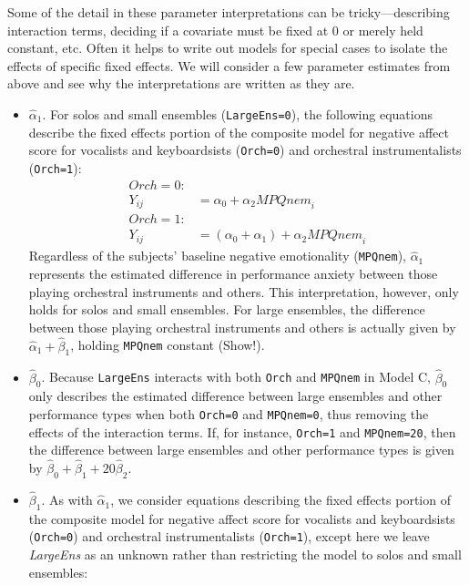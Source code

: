 \documentclass[
]{krantz}
\begin{document}
Some of the detail in these parameter interpretations can be tricky---describing interaction terms, deciding if a covariate must be fixed at 0 or merely held constant, etc. Often it helps to write out models for special cases to isolate the effects of specific fixed effects. We will consider a few parameter estimates from above and see why the interpretations are written as they are.

\begin{itemize}
\item
  \(\hat{\alpha}_{1}\). For solos and small ensembles (\texttt{LargeEns=0}), the following equations describe the fixed effects portion of the composite model for negative affect score for vocalists and keyboardsists (\texttt{Orch=0}) and orchestral instrumentalists (\texttt{Orch=1}):
  \begin{align*}
  \textstyle{Orch}=0: & \\
  Y_{ij} & = \alpha_{0}+\alpha_{2}\textstyle{MPQnem}_{i} \\
  \textstyle{Orch}=1: & \\
  Y_{ij} & = (\alpha_{0}+\alpha_{1})+\alpha_{2}\textstyle{MPQnem}_{i}
  \end{align*}
  Regardless of the subjects' baseline negative emotionality (\texttt{MPQnem}), \(\hat{\alpha}_{1}\) represents the estimated difference in performance anxiety between those playing orchestral instruments and others. This interpretation, however, only holds for solos and small ensembles. For large ensembles, the difference between those playing orchestral instruments and others is actually given by \(\hat{\alpha}_{1}+\hat{\beta}_{1}\), holding \texttt{MPQnem} constant (Show!).
\item
  \(\hat{\beta}_{0}\). Because \texttt{LargeEns} interacts with both \texttt{Orch} and \texttt{MPQnem} in Model C, \(\hat{\beta}_{0}\) only describes the estimated difference between large ensembles and other performance types when both \texttt{Orch=0} and \texttt{MPQnem=0}, thus removing the effects of the interaction terms. If, for instance, \texttt{Orch=1} and \texttt{MPQnem=20}, then the difference between large ensembles and other performance types is given by \(\hat{\beta}_{0}+\hat{\beta}_{1}+20\hat{\beta}_{2}\).
\item
  \(\hat{\beta}_{1}\). As with \(\hat{\alpha}_{1}\), we consider equations describing the fixed effects portion of the composite model for negative affect score for vocalists and keyboardsists (\texttt{Orch=0}) and orchestral instrumentalists (\texttt{Orch=1}), except here we leave \emph{LargeEns} as an unknown rather than restricting the model to solos and small ensembles:

\end{itemize}
\end{document}
